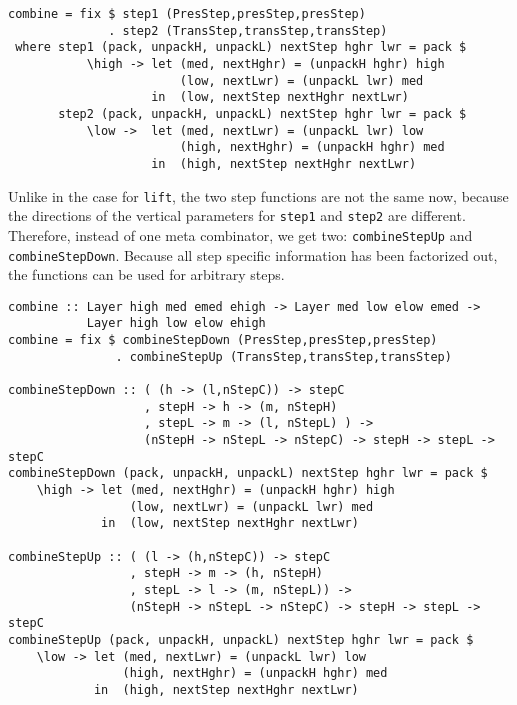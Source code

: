 \begin{small}
\begin{verbatim}
combine = fix $ step1 (PresStep,presStep,presStep) 
              . step2 (TransStep,transStep,transStep) 
 where step1 (pack, unpackH, unpackL) nextStep hghr lwr = pack $
           \high -> let (med, nextHghr) = (unpackH hghr) high
                        (low, nextLwr) = (unpackL lwr) med
                    in  (low, nextStep nextHghr nextLwr)
       step2 (pack, unpackH, unpackL) nextStep hghr lwr = pack $
           \low ->  let (med, nextLwr) = (unpackL lwr) low
                        (high, nextHghr) = (unpackH hghr) med
                    in  (high, nextStep nextHghr nextLwr)
\end{verbatim}
\end{small}

Unlike in the case for \texttt{lift}, the two step functions are not the same now, because the directions of the vertical parameters for \texttt{step1} and \texttt{step2} are different. Therefore, instead of one meta combinator, we get two: \texttt{combineStepUp} and \texttt{combineStepDown}. Because all step specific information has been factorized out, the functions can be used for arbitrary steps.

\begin{small}
\begin{verbatim}
combine :: Layer high med emed ehigh -> Layer med low elow emed -> 
           Layer high low elow ehigh
combine = fix $ combineStepDown (PresStep,presStep,presStep) 
               . combineStepUp (TransStep,transStep,transStep) 

combineStepDown :: ( (h -> (l,nStepC)) -> stepC 
                   , stepH -> h -> (m, nStepH)
                   , stepL -> m -> (l, nStepL) ) -> 
                   (nStepH -> nStepL -> nStepC) -> stepH -> stepL -> stepC
combineStepDown (pack, unpackH, unpackL) nextStep hghr lwr = pack $
    \high -> let (med, nextHghr) = (unpackH hghr) high
                 (low, nextLwr) = (unpackL lwr) med
             in  (low, nextStep nextHghr nextLwr)

combineStepUp :: ( (l -> (h,nStepC)) -> stepC 
                 , stepH -> m -> (h, nStepH)
                 , stepL -> l -> (m, nStepL)) -> 
                 (nStepH -> nStepL -> nStepC) -> stepH -> stepL -> stepC
combineStepUp (pack, unpackH, unpackL) nextStep hghr lwr = pack $
    \low -> let (med, nextLwr) = (unpackL lwr) low
                (high, nextHghr) = (unpackH hghr) med
            in  (high, nextStep nextHghr nextLwr)
\end{verbatim}
\end{small}

